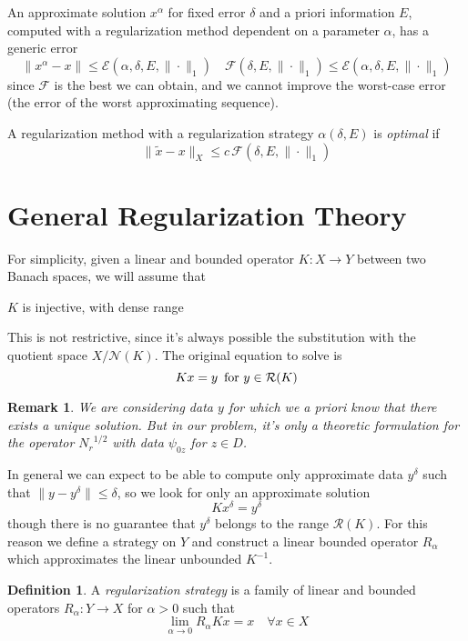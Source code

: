 \documentclass[10pt, a4paper, twoside, openright]{book}
\theoremstyle{definition}
\newtheorem{definition}[subsection]{Definition}
\theoremstyle{plain}
\theoremstyle{plain}
\theoremstyle{plain}
\theoremstyle{plain}
\newtheorem{remark}[subsection]{Remark}
\theoremstyle{plain}
\theoremstyle{plain}
\theoremstyle{plain}
\theoremstyle{plain}
\begin{document}
An approximate solution $x^\alpha$ for fixed error $\delta$ and a priori information $E$, computed with a regularization method dependent on a parameter $\alpha$, has a generic error
\begin{equation}
 \|x^\alpha -x\| \leq \mathcal{E}(\alpha, \delta, E, \|\cdot\|_1) \quad \mathcal{F}(\delta, E, \|\cdot\|_1)\leq\mathcal{E}(\alpha, \delta, E, \|\cdot\|_1)
\end{equation}
since $\mathcal{F}$ is the best we can obtain, and we cannot improve the worst-case error (the error of the worst approximating sequence).
\par
A regularization method with a regularization strategy $\alpha(\delta, E)$ is \emph{optimal} if 
\begin{equation}
 \|\tilde{x} - x\|_X \leq c\,\mathcal{F}(\delta, E, \|\cdot\|_1)
\end{equation}

\section{General Regularization Theory}
For simplicity, given a linear and bounded operator $K:X\to Y$ between two Banach spaces, we will assume that
\begin{center}
 $K$ is injective, with dense range
\end{center}
This is not restrictive, since it's always possible the substitution with the quotient space $X/ \mathcal{N}(K)$. The original equation to solve is
\begin{equation}
 Kx=y\,\textup{ for }y\in \mathcal{R}(K)
\end{equation}
\begin{remark}
 We are considering data $y$ for which we a priori know that there exists a unique solution. But in our problem, it's only a theoretic formulation for the operator ${N_r}^{1/2}$ with data $\psi_{0z}$ for $z\in D$.
\end{remark}
In general we can expect to be able to compute only approximate data $y^\delta$ such that $\|y - y^\delta\| \leq \delta$, so we look for only an approximate solution
\begin{equation}
 Kx^\delta = y^\delta
\end{equation}
though there is no guarantee that $y^\delta$ belongs to the range $\mathcal{R}(K)$. For this reason we define a strategy on $Y$ and construct a linear bounded operator $R_\alpha$ which approximates the linear unbounded $K^{-1}$.
\begin{definition}
 A \emph{regularization strategy} is a family of linear and bounded operators $R_\alpha : Y \to X$  for $\alpha> 0$ such that
 \begin{equation}
  \lim_{\alpha\to 0}R_\alpha Kx = x\quad \forall x \in X
 \end{equation}
\end{definition}
\end{document}
